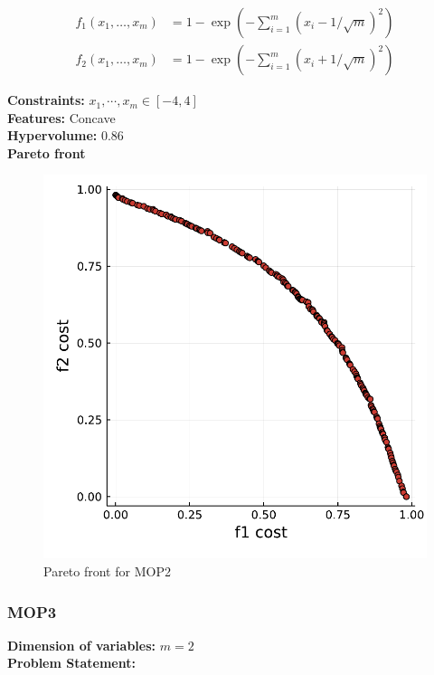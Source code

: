 \documentclass[11pt,oneside,onecolumn,openright]{article}
\begin{document}
  \begin{equation}
  \begin{aligned}
  f_{1}\left(x_{1}, \ldots, x_{m}\right) &=1-\exp \left(-\sum_{i=1}^{m}\left(x_{i}-1 / \sqrt{m}\right)^{2}\right) \\
  f_{2}\left(x_{1}, \ldots, x_{m}\right) &=1-\exp \left(-\sum_{i=1}^{m}\left(x_{i}+1 / \sqrt{m}\right)^{2}\right)
  \end{aligned}
  \end{equation}

  \noindent\textbf{Constraints: } $x_{1},\cdots , x_{m} \in[-4,4]$\\
  \noindent\textbf{Features: } Concave\\
  \noindent\textbf{Hypervolume: } 0.86\\
  \noindent\textbf{Pareto front}
      \begin{figure}[H]
      \centering
      \includegraphics[width=12cm]{fig/mop2.pdf}
      \cprotect\caption{Pareto front for MOP2}
      \end{figure}


   \subsubsection{MOP3~\cite{huband2006review}}
   \textbf{Dimension of variables: }$m=2$\\
  \noindent\textbf{Problem Statement: }
\end{document}
